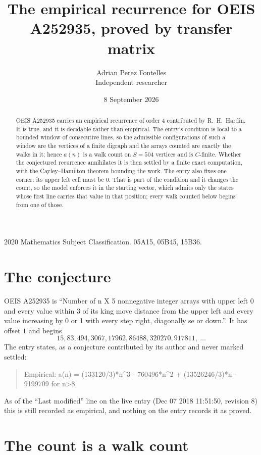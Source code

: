 \documentclass[11pt,a4paper]{article}
\title{The empirical recurrence for OEIS A252935, proved by transfer matrix}
\author{Adrian Perez Fontelles\\ \small Independent researcher}
\date{8 September 2026}
\theoremstyle{plain}
\theoremstyle{definition}
\begin{document}
\maketitle

\begin{abstract}
OEIS A252935 carries an empirical recurrence of order $4$ contributed by R.~H.~Hardin. It is
true, and it is decidable rather than empirical. The entry's condition is local to a bounded window of consecutive lines, so
the admissible configurations of such a window are the vertices of a finite digraph and the
arrays counted are exactly the walks in it; hence $a(n)$ is a walk count on $S=504$ vertices
and is $C$-finite. Whether the conjectured recurrence annihilates it is then settled by a
finite exact computation, with the Cayley--Hamilton theorem bounding the work.
 The entry also fixes one corner: its upper left cell must be $0$. That is part of the condition and it changes the count, so the model enforces it in the starting vector, which admits only the states whose first line carries that value in that position; every walk counted below begins from one of those.\end{abstract}

\noindent\small 2020 Mathematics Subject Classification. 05A15, 05B45, 15B36.\normalsize

\section{The conjecture}

OEIS A252935 is ``Number of n X 5 nonnegative integer arrays with upper left 0 and every value within 3 of its king move distance from the upper left and every value increasing by 0 or 1 with every step right, diagonally se or down.''. It has offset $1$ and begins
\[
15, 83, 494, 3067, 17962, 86488, 320270, 917811,\ \dots
\]
The entry states, as a conjecture contributed by its author and never marked settled:
\begin{quote}
Empirical: a(n) = (133120/3)*n\^{}3 - 760496*n\^{}2 + (13526246/3)*n - 9199709 for n>8.
\end{quote}
As of the ``Last modified'' line on the live entry (Dec 07 2018 11:51:50, revision 8) this is still
recorded as empirical, and nothing on the entry records it as proved.

\section{The count is a walk count}
\end{document}
